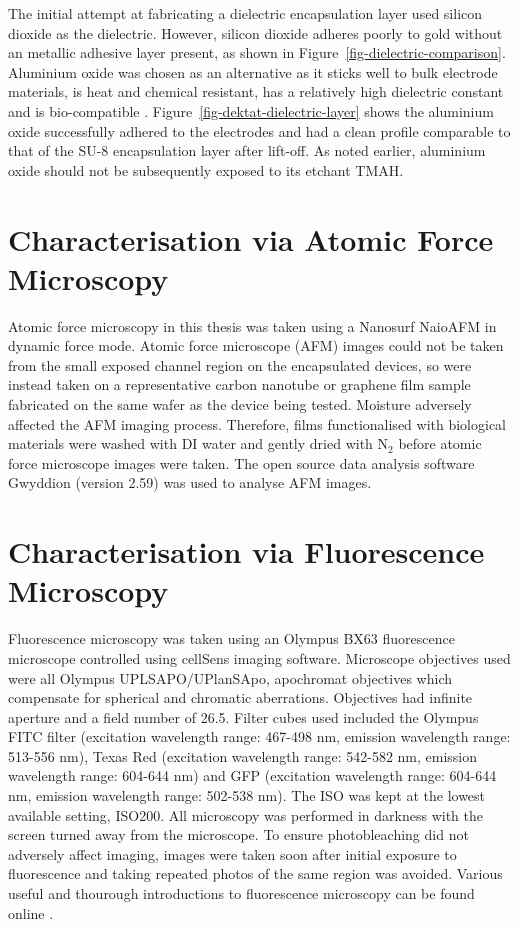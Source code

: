 \documentclass[
  a4paper,
]{scrbook}
\begin{document}
The initial attempt at fabricating a dielectric encapsulation layer used
silicon dioxide as the dielectric. However, silicon dioxide adheres
poorly to gold without an metallic adhesive layer present, as shown in
Figure~\ref{fig-dielectric-comparison}. Aluminium oxide was chosen as an
alternative as it sticks well to bulk electrode materials, is heat and
chemical resistant, has a relatively high dielectric constant and is
bio-compatible \autocite{Guarnieri2014,Albarghouthi2022,Kolodzey2000}.
Figure~\ref{fig-dektat-dielectric-layer} shows the aluminium oxide
successfully adhered to the electrodes and had a clean profile
comparable to that of the SU-8 encapsulation layer after lift-off. As
noted earlier, aluminium oxide should not be subsequently exposed to its
etchant TMAH.

\hypertarget{sec-afm-characterisation}{%
\section{Characterisation via Atomic Force
Microscopy}\label{sec-afm-characterisation}}

Atomic force microscopy in this thesis was taken using a Nanosurf
NaioAFM in dynamic force mode. Atomic force microscope (AFM) images
could not be taken from the small exposed channel region on the
encapsulated devices, so were instead taken on a representative carbon
nanotube or graphene film sample fabricated on the same wafer as the
device being tested. Moisture adversely affected the AFM imaging
process. Therefore, films functionalised with biological materials were
washed with DI water and gently dried with N\(_2\) before atomic force
microscope images were taken. The open source data analysis software
Gwyddion (version 2.59) was used to analyse AFM images.

\hypertarget{sec-fluorescence-characterisation}{%
\section{Characterisation via Fluorescence
Microscopy}\label{sec-fluorescence-characterisation}}

Fluorescence microscopy was taken using an Olympus BX63 fluorescence
microscope controlled using cellSens imaging software. Microscope
objectives used were all Olympus UPLSAPO/UPlanSApo, apochromat
objectives which compensate for spherical and chromatic aberrations.
Objectives had infinite aperture and a field number of 26.5. Filter
cubes used included the Olympus FITC filter (excitation wavelength
range: 467-498 nm, emission wavelength range: 513-556 nm), Texas Red
(excitation wavelength range: 542-582 nm, emission wavelength range:
604-644 nm) and GFP (excitation wavelength range: 604-644 nm, emission
wavelength range: 502-538 nm). The ISO was kept at the lowest available
setting, ISO200. All microscopy was performed in darkness with the
screen turned away from the microscope. To ensure photobleaching did not
adversely affect imaging, images were taken soon after initial exposure
to fluorescence and taking repeated photos of the same region was
avoided. Various useful and thourough introductions to fluorescence
microscopy can be found online \autocite{Nikon,Zeiss}.
\end{document}
